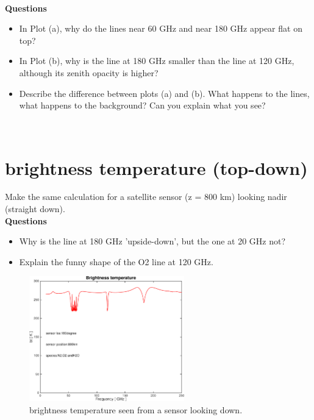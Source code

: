 \documentclass[paper=a4, fontsize=11pt]{scrartcl} %
\begin{document}
\ \\
\textbf{Questions}
\begin{itemize}
	\item In Plot (a), why do the lines near 60 GHz and near 180 GHz appear flat on top?

	\item In Plot (b), why is the line at 180 GHz smaller than the line at 120 GHz, although its zenith opacity is higher?

	\item Describe the difference between plots (a) and (b). What happens to the lines, what happens to the background? Can you explain what you see?
\end{itemize}
\ \\
\section{brightness temperature (top-down)}

Make the same calculation for a satellite sensor (z = 800 km) looking nadir (straight down). \ \\

\textbf{Questions}
\begin{itemize}
	\item Why is the line at 180 GHz 'upside-down', but the one at 20 GHz not?
	\item Explain the funny shape of the O2 line at 120 GHz.
\end{itemize}

\begin{figure}[H]
\centering
 \includegraphics[width=0.6\textwidth]{plots/bt_N2+O2+H2O_800km_180deg.pdf}
 \caption{brightness temperature seen from a sensor looking down. }
\end{figure}
\end{document}
